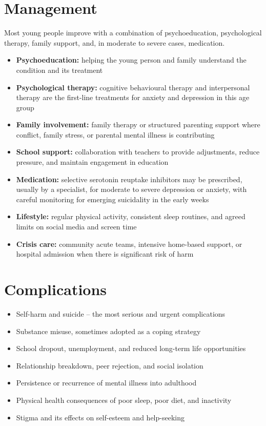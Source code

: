 \section*{Management}
Most young people improve with a combination of psychoeducation, psychological therapy, family support, and, in moderate to severe cases, medication.

\begin{itemize}
    \item \textbf{Psychoeducation:} helping the young person and family understand the condition and its treatment
    \item \textbf{Psychological therapy:} cognitive behavioural therapy and interpersonal therapy are the first-line treatments for anxiety and depression in this age group
    \item \textbf{Family involvement:} family therapy or structured parenting support where conflict, family stress, or parental mental illness is contributing
    \item \textbf{School support:} collaboration with teachers to provide adjustments, reduce pressure, and maintain engagement in education
    \item \textbf{Medication:} selective serotonin reuptake inhibitors may be prescribed, usually by a specialist, for moderate to severe depression or anxiety, with careful monitoring for emerging suicidality in the early weeks
    \item \textbf{Lifestyle:} regular physical activity, consistent sleep routines, and agreed limits on social media and screen time
    \item \textbf{Crisis care:} community acute teams, intensive home-based support, or hospital admission when there is significant risk of harm
\end{itemize}

\section*{Complications}
\begin{itemize}
    \item Self-harm and suicide -- the most serious and urgent complications
    \item Substance misuse, sometimes adopted as a coping strategy
    \item School dropout, unemployment, and reduced long-term life opportunities
    \item Relationship breakdown, peer rejection, and social isolation
    \item Persistence or recurrence of mental illness into adulthood
    \item Physical health consequences of poor sleep, poor diet, and inactivity
    \item Stigma and its effects on self-esteem and help-seeking
\end{itemize}

